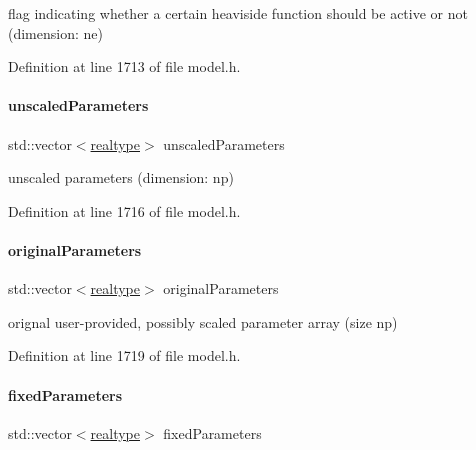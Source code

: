 flag indicating whether a certain heaviside function should be active or not (dimension\+: ne) 

Definition at line 1713 of file model.\+h.

\mbox{\label{classamici_1_1_model_a2f57f75ff99d8bfcabb33c8cda86308d}} 
\paragraph{\texorpdfstring{unscaled\+Parameters}{unscaledParameters}}
{\footnotesize\ttfamily std\+::vector$<$\mbox{\hyperlink{namespaceamici_a1bdce28051d6a53868f7ccbf5f2c14a3}{realtype}}$>$ unscaled\+Parameters\hspace{0.3cm}{\ttfamily [protected]}}

unscaled parameters (dimension\+: np) 

Definition at line 1716 of file model.\+h.

\mbox{\label{classamici_1_1_model_a65d6047f145381b0363ac02feb2433b4}} 
\paragraph{\texorpdfstring{original\+Parameters}{originalParameters}}
{\footnotesize\ttfamily std\+::vector$<$\mbox{\hyperlink{namespaceamici_a1bdce28051d6a53868f7ccbf5f2c14a3}{realtype}}$>$ original\+Parameters\hspace{0.3cm}{\ttfamily [protected]}}

orignal user-\/provided, possibly scaled parameter array (size np) 

Definition at line 1719 of file model.\+h.

\mbox{\label{classamici_1_1_model_ac1d5115134ec1c839f1e913724ceb2b4}} 
\paragraph{\texorpdfstring{fixed\+Parameters}{fixedParameters}}
{\footnotesize\ttfamily std\+::vector$<$\mbox{\hyperlink{namespaceamici_a1bdce28051d6a53868f7ccbf5f2c14a3}{realtype}}$>$ fixed\+Parameters\hspace{0.3cm}{\ttfamily [protected]}}

